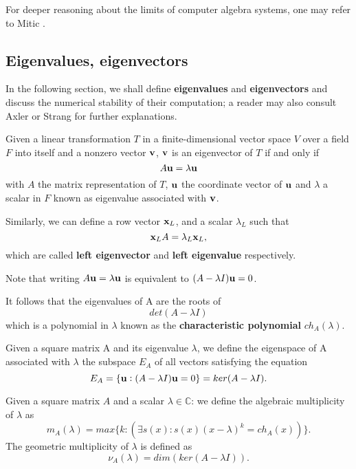 For deeper reasoning about the limits of computer algebra systems, one may refer to Mitic \cite{mitic}.

\subsection*{Eigenvalues, eigenvectors}
In the following section, we shall define \textbf{eigenvalues} and \textbf{eigenvectors} and discuss the numerical stability
of their computation; a reader may also consult Axler \cite{axler} or Strang \cite{strang09} for further explanations.

\begin{definition}
    Given a linear transformation \(T\) in a finite-dimensional vector space \(V\) over a field \(F\) into itself and a nonzero
    vector
    \(\vb{v}\), \(\vb{v}\) is an eigenvector of \(T\) if and only if
    \[ A \vb{u} = \lambda \vb{u} \]
    with \(A\) the matrix representation of \(T\), \(\vb{u}\) the coordinate vector of \(\vb{u}\) and \(\lambda\) a scalar in
    \(F\) known as eigenvalue associated with \(\vb{v}\).

    Similarly, we can define a row vector \(\vb{x}_{L}\), and a scalar \(\lambda_{L}\) such that
    \[\vb{x}_{L}A = \lambda_{L}\vb{x}_{L},\]
    which are called \textbf{left eigenvector} and \textbf{left eigenvalue} respectively.
\end{definition}

\begin{remark}
    Note that writing
    \( A \vb{u} = \lambda \vb{u} \) is equivalent to \( (A - \lambda I)\vb{u} = 0 \).

    It follows that the eigenvalues of A are the roots of
    \[
        det(A - \lambda I)
    \]
    which is a polynomial in \(\lambda\) known as the \textbf{characteristic polynomial} \(ch_{A}(\lambda)\).
\end{remark}

\begin{definition}[Eigenspace]
    Given a square matrix A and its eigenvalue \(\lambda\), we define the eigenspace of A associated with \(\lambda\) the subspace
    \(E_{A}\) of all vectors satisfying the equation
    \[E_{A} = \{\vb{u}: (A - \lambda I)\vb{u} = 0\} = ker(A - \lambda I).\]
\end{definition}

\begin{definition}
    Given a square matrix \(A\) and a scalar \(\lambda \in \mathbb{C}\): we define the algebraic multiplicity of \(\lambda\) as
    \[ m_{A}(\lambda) = max\{k: (\exists s(x): s(x)(x - \lambda)^k = ch_{A}(x))\}.\]
    The geometric multiplicity of \(\lambda\) is defined as
    \[
        \nu_{A}(\lambda) = dim(ker(A - \lambda I)).
    \]
\end{definition}


